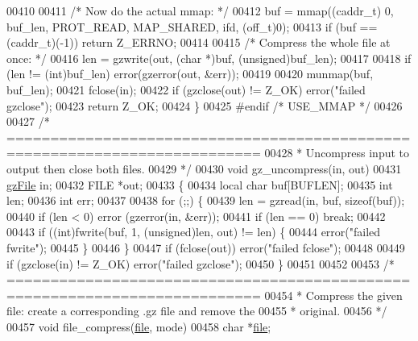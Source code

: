 \begin{DoxyCode}
{{{{00410 
00411     \textcolor{comment}{/* Now do the actual mmap: */}
00412     buf = mmap((caddr\_t) 0, buf\_len, PROT\_READ, MAP\_SHARED, ifd, (off\_t)0);
00413     \textcolor{keywordflow}{if} (buf == (caddr\_t)(-1)) \textcolor{keywordflow}{return} Z\_ERRNO;
00414 
00415     \textcolor{comment}{/* Compress the whole file at once: */}
00416     len = gzwrite(out, (\textcolor{keywordtype}{char} *)buf, (\textcolor{keywordtype}{unsigned})buf\_len);
00417 
00418     \textcolor{keywordflow}{if} (len != (\textcolor{keywordtype}{int})buf\_len) error(gzerror(out, &err));
00419 
00420     munmap(buf, buf\_len);
00421     fclose(in);
00422     \textcolor{keywordflow}{if} (gzclose(out) != Z\_OK) error(\textcolor{stringliteral}{"failed gzclose"});
00423     \textcolor{keywordflow}{return} Z\_OK;
00424 \}
00425 \textcolor{preprocessor}{#endif }\textcolor{comment}{/* USE\_MMAP */}\textcolor{preprocessor}{}
00426 
00427 \textcolor{comment}{/* ===========================================================================}
00428 \textcolor{comment}{ * Uncompress input to output then close both files.}
00429 \textcolor{comment}{ */}
00430 \textcolor{keywordtype}{void} gz\_uncompress(in, out)
00431     \hyperlink{structgz_file__s}{gzFile} in;
00432     FILE   *out;
00433 \{
00434     local \textcolor{keywordtype}{char} buf[BUFLEN];
00435     \textcolor{keywordtype}{int} len;
00436     \textcolor{keywordtype}{int} err;
00437 
00438     \textcolor{keywordflow}{for} (;;) \{
00439         len = gzread(in, buf, \textcolor{keyword}{sizeof}(buf));
00440         \textcolor{keywordflow}{if} (len < 0) error (gzerror(in, &err));
00441         \textcolor{keywordflow}{if} (len == 0) \textcolor{keywordflow}{break};
00442 
00443         \textcolor{keywordflow}{if} ((\textcolor{keywordtype}{int})fwrite(buf, 1, (\textcolor{keywordtype}{unsigned})len, out) != len) \{
00444             error(\textcolor{stringliteral}{"failed fwrite"});
00445         \}
00446     \}
00447     \textcolor{keywordflow}{if} (fclose(out)) error(\textcolor{stringliteral}{"failed fclose"});
00448 
00449     \textcolor{keywordflow}{if} (gzclose(in) != Z\_OK) error(\textcolor{stringliteral}{"failed gzclose"});
00450 \}
00451 
00452 
00453 \textcolor{comment}{/* ===========================================================================}
00454 \textcolor{comment}{ * Compress the given file: create a corresponding .gz file and remove the}
00455 \textcolor{comment}{ * original.}
00456 \textcolor{comment}{ */}
00457 \textcolor{keywordtype}{void} file\_compress(\hyperlink{structfile}{file}, mode)
00458     \textcolor{keywordtype}{char}  *\hyperlink{structfile}{file};
}}}}
\end{DoxyCode}

